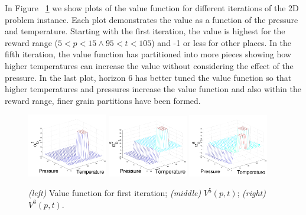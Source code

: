 \documentclass{article} %
\begin{document}
In Figure ~\ref{fig:3D}  we show plots of the value function for different iterations of the 2D problem instance. Each plot demonstrates the value as a function of the pressure and temperature. Starting with the first iteration, the value is highest for the reward range ($5<p<15 \wedge 95<t<105$) and -1 or less for other places. In the fifth iteration, the value function has partitioned into more pieces showing how higher temperatures can increase the value without considering the effect of the pressure. In the last plot, horizon 6 has better tuned the value function so that higher temperatures and pressures increase the value function and also within the reward range, finer grain partitions have been formed. 
\begin{figure}[tbp!]
\vspace{-2mm}
\centering
\includegraphics[width=0.31\textwidth]{pics/2d1.pdf}
\includegraphics[width=0.31\textwidth]{pics/2d9.pdf}
\includegraphics[width=0.31\textwidth]{pics/2d111.pdf}
\vspace{-3mm}
\caption{\footnotesize 
{\it (left)} Value function for first iteration; 
{\it (middle)} $V^5(p,t)$; 
{\it (right)} $V^6(p,t)$.
}
\label{fig:3D}
\vspace{-4mm}
\end{figure}
\end{document}
